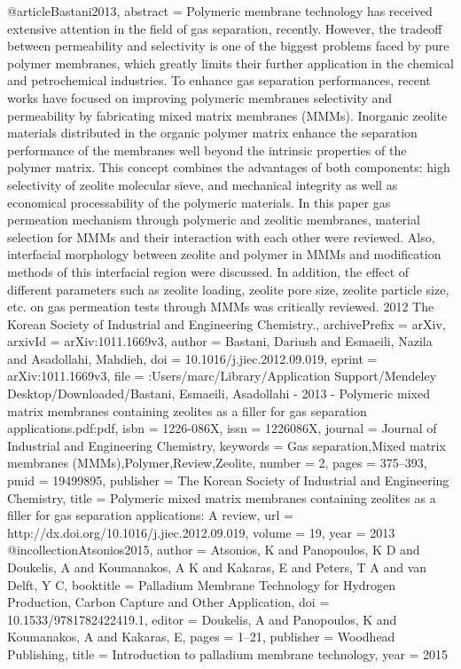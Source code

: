 @article{Bastani2013,
abstract = {Polymeric membrane technology has received extensive attention in the field of gas separation, recently. However, the tradeoff between permeability and selectivity is one of the biggest problems faced by pure polymer membranes, which greatly limits their further application in the chemical and petrochemical industries. To enhance gas separation performances, recent works have focused on improving polymeric membranes selectivity and permeability by fabricating mixed matrix membranes (MMMs). Inorganic zeolite materials distributed in the organic polymer matrix enhance the separation performance of the membranes well beyond the intrinsic properties of the polymer matrix. This concept combines the advantages of both components: high selectivity of zeolite molecular sieve, and mechanical integrity as well as economical processability of the polymeric materials. In this paper gas permeation mechanism through polymeric and zeolitic membranes, material selection for MMMs and their interaction with each other were reviewed. Also, interfacial morphology between zeolite and polymer in MMMs and modification methods of this interfacial region were discussed. In addition, the effect of different parameters such as zeolite loading, zeolite pore size, zeolite particle size, etc. on gas permeation tests through MMMs was critically reviewed. {\textcopyright} 2012 The Korean Society of Industrial and Engineering Chemistry.},
archivePrefix = {arXiv},
arxivId = {arXiv:1011.1669v3},
author = {Bastani, Dariush and Esmaeili, Nazila and Asadollahi, Mahdieh},
doi = {10.1016/j.jiec.2012.09.019},
eprint = {arXiv:1011.1669v3},
file = {:Users/marc/Library/Application Support/Mendeley Desktop/Downloaded/Bastani, Esmaeili, Asadollahi - 2013 - Polymeric mixed matrix membranes containing zeolites as a filler for gas separation applications.pdf:pdf},
isbn = {1226-086X},
issn = {1226086X},
journal = {Journal of Industrial and Engineering Chemistry},
keywords = {Gas separation,Mixed matrix membranes (MMMs),Polymer,Review,Zeolite},
number = {2},
pages = {375--393},
pmid = {19499895},
publisher = {The Korean Society of Industrial and Engineering Chemistry},
title = {{Polymeric mixed matrix membranes containing zeolites as a filler for gas separation applications: A review}},
url = {http://dx.doi.org/10.1016/j.jiec.2012.09.019},
volume = {19},
year = {2013}
}
@incollection{Atsonios2015,
author = {Atsonios, K and Panopoulos, K D and Doukelis, A and Koumanakos, A K and Kakaras, E and Peters, T A and van Delft, Y C},
booktitle = {Palladium Membrane Technology for Hydrogen Production, Carbon Capture and Other Application},
doi = {10.1533/9781782422419.1},
editor = {Doukelis, A and Panopoulos, K and Koumanakos, A and Kakaras, E},
pages = {1--21},
publisher = {Woodhead Publishing},
title = {{Introduction to palladium membrane technology}},
year = {2015}
}
